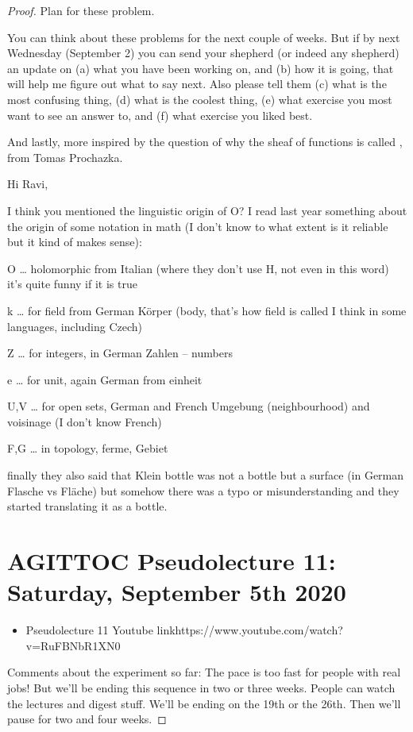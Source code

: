 \documentclass{book}
\theoremstyle{definition}
\begin{document}
\begin{proof}
Plan for these problem.

You can think about these problems for the next couple of weeks. But if by next Wednesday (September 2) you can send your shepherd (or indeed any shepherd) an update on (a) what you have been working on, and (b) how it is going, that will help me figure out what to say next. Also please tell them (c) what is the most confusing thing, (d) what is the coolest thing, (e) what exercise you most want to see an answer to, and (f) what exercise you liked best.

And lastly, more inspired by the question of why the sheaf of functions is called , from Tomas Prochazka.

Hi Ravi,

I think you mentioned the linguistic origin of O? I read last year something about the origin of some notation in math (I don’t know to what extent is it reliable but it kind of makes sense):

O … holomorphic from Italian (where they don’t use H, not even in this word) 🙂 it’s quite funny if it is true

k … for field from German Körper (body, that’s how field is called I think in some languages, including Czech)

Z … for integers, in German Zahlen – numbers

e … for unit, again German from einheit

U,V … for open sets, German and French Umgebung (neighbourhood) and voisinage (I don’t know French)

F,G … in topology, ferme, Gebiet

finally they also said that Klein bottle was not a bottle but a surface (in German Flasche vs Fläche) but somehow there was a typo or misunderstanding and they started translating it as a bottle.

\section{AGITTOC Pseudolecture 11: Saturday, September 5th 2020}
\begin{itemize}
\item {Pseudolecture 11 Youtube link}{https://www.youtube.com/watch?v=RuFBNbR1XN0}
\end{itemize}

Comments about the experiment so far: The pace is too fast for people with
real jobs! But we'll be ending this sequence in two or three weeks. People can
watch the lectures and digest stuff. We'll be ending on the 19th or the 26th.
Then we'll pause for two and four weeks.


\end{proof}
\end{document}
